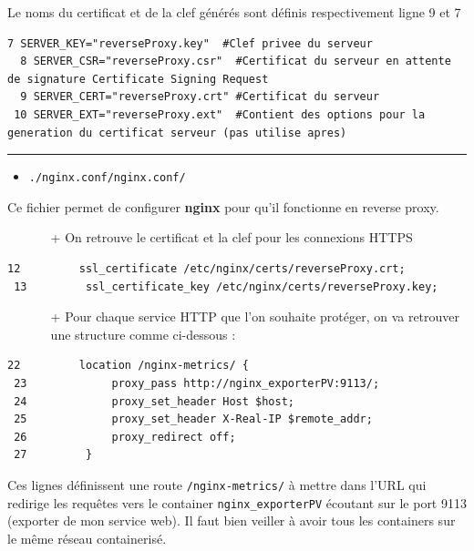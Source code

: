 \documentclass[french, 12pt]{article}%
\newcommand{\itemE}{\item[$\bullet$]}
\begin{document}
Le noms du certificat et de la clef générés sont définis respectivement ligne 9 et 7

\begin{lstlisting}[style=commande]
  7 SERVER_KEY="reverseProxy.key"  #Clef privee du serveur
  8 SERVER_CSR="reverseProxy.csr"  #Certificat du serveur en attente de signature Certificate Signing Request
  9 SERVER_CERT="reverseProxy.crt" #Certificat du serveur
 10 SERVER_EXT="reverseProxy.ext"  #Contient des options pour la generation du certificat serveur (pas utilise apres)
\end{lstlisting}



\begin{center}
 \rule{0.75\linewidth}{1pt}
 \end{center}

\begin{itemize}
\itemE \verb?./nginx.conf/nginx.conf/?
\end{itemize}

Ce fichier permet de configurer \textbf{nginx} pour qu'il fonctionne en reverse proxy.

\begin{itemize}
\item[ ] 
\begin{itemize}
\item[+] On retrouve le certificat et la clef pour les connexions HTTPS
\end{itemize}
\end{itemize}
\begin{lstlisting}[style=commande]
 12         ssl_certificate /etc/nginx/certs/reverseProxy.crt;
 13         ssl_certificate_key /etc/nginx/certs/reverseProxy.key;
\end{lstlisting}


\begin{itemize}
\item[ ] 
\begin{itemize}
\item[+] Pour chaque service HTTP que l'on souhaite protéger, on va retrouver une structure comme ci-dessous : 
\end{itemize}
\end{itemize}
\begin{lstlisting}[style=commande]
 22         location /nginx-metrics/ {
 23             proxy_pass http://nginx_exporterPV:9113/;
 24             proxy_set_header Host $host;
 25             proxy_set_header X-Real-IP $remote_addr;
 26             proxy_redirect off;
 27         }
\end{lstlisting}
Ces lignes définissent une route \verb?/nginx-metrics/? à mettre dans l'URL qui redirige les requêtes vers le container \verb?nginx_exporterPV? écoutant sur le port 9113 (exporter de mon service web). Il faut bien veiller à avoir tous les containers sur le même réseau containerisé.
\end{document}
